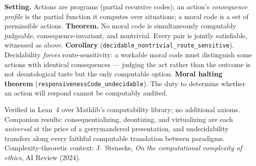 \documentclass[11pt]{article}
\begin{document}
\vspace{4pt}

{\small
\textbf{Setting.} Actions are programs (partial recursive codes); an
action's \emph{consequence profile} is the partial function it computes
over situations; a moral code is a set of permissible actions.
\textbf{Theorem.} No moral code is simultaneously computably judgeable,
consequence-invariant, and nontrivial. Every pair is jointly satisfiable,
witnessed as above. \textbf{Corollary} (\texttt{decidable\_nontrivial\_route\_sensitive}).
Decidability \emph{forces} route-sensitivity: a workable moral code must
distinguish some actions with identical consequences --- judging the act
rather than the outcome is not deontological taste but the only computable
option. \textbf{Moral halting theorem}
(\texttt{responsivenessCode\_undecidable}). The duty to determine whether
an action will respond cannot be computably audited.
}

\vspace{8pt}

\begin{center}
\end{center}

\vfill

{\footnotesize
Verified in Lean~4 over Mathlib's computability library; no additional
axioms. Companion results: consequentializing, deontizing, and
virtualizing are each \emph{universal} at the price of a gerrymandered
presentation, and undecidability transfers along every faithful computable
translation between paradigms. Complexity-theoretic context: J.~Stenseke,
\emph{On the computational complexity of ethics}, AI Review (2024).
}
\end{document}

